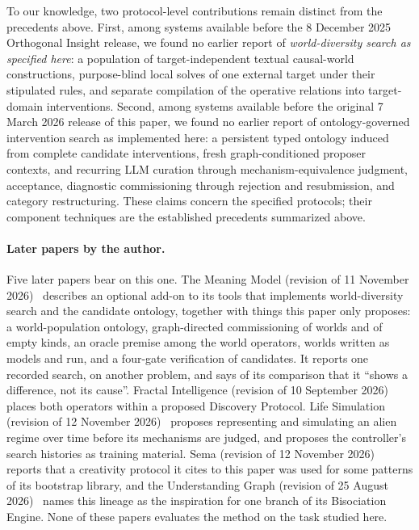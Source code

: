 \documentclass[11pt,a4paper]{article}
\begin{document}
To our knowledge, two protocol-level contributions remain distinct from the precedents above. First, among systems available before the 8 December 2025 Orthogonal Insight release, we found no earlier report of \emph{world-diversity search as specified here}: a population of target-independent textual causal-world constructions, purpose-blind local solves of one external target under their stipulated rules, and separate compilation of the operative relations into target-domain interventions. Second, among systems available before the original 7 March 2026 release of this paper, we found no earlier report of ontology-governed intervention search as implemented here: a persistent typed ontology induced from complete candidate interventions, fresh graph-conditioned proposer contexts, and recurring LLM curation through mechanism-equivalence judgment, acceptance, diagnostic commissioning through rejection and resubmission, and category restructuring. These claims concern the specified protocols; their component techniques are the established precedents summarized above.

\paragraph{Later papers by the author.} Five later papers bear on this one. The Meaning Model (revision of 11 November 2026)~\cite{westerbergMeaning2026} describes an optional add-on to its tools that implements world-diversity search and the candidate ontology, together with things this paper only proposes: a world-population ontology, graph-directed commissioning of worlds and of empty kinds, an oracle premise among the world operators, worlds written as models and run, and a four-gate verification of candidates. It reports one recorded search, on another problem, and says of its comparison that it ``shows a difference, not its cause''. Fractal Intelligence (revision of 10 September 2026)~\cite{westerberg2026fractal} places both operators within a proposed Discovery Protocol. Life Simulation (revision of 12 November 2026)~\cite{westerbergLife2026} proposes representing and simulating an alien regime over time before its mechanisms are judged, and proposes the controller's search histories as training material. Sema (revision of 12 November 2026)~\cite{westerbergSema2026} reports that a creativity protocol it cites to this paper was used for some patterns of its bootstrap library, and the Understanding Graph (revision of 25 August 2026)~\cite{westerbergUnderstanding2026} names this lineage as the inspiration for one branch of its Bisociation Engine. None of these papers evaluates the method on the task studied here.
\end{document}
